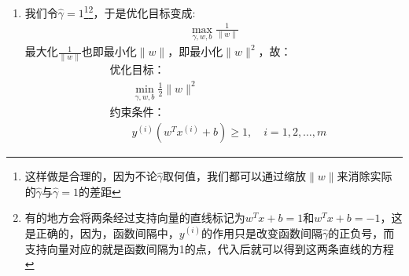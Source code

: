 \begin{enumerate}
	\item 我们令$\hat{\gamma}=1$\footnote{这样做是合理的，因为不论$\hat{\gamma}$取何值，我们都可以通过缩放$\|w\|$来消除实际的$\hat{\gamma}$与$\hat{\gamma}=1$的差距}\footnote{有的地方会将两条经过支持向量的直线标记为$w^Tx+b=1$和$w^Tx+b=-1$，这是正确的，因为，函数间隔中，$y^{(i)}$的作用只是改变函数间隔$\hat{\gamma}$的正负号，而支持向量对应的就是函数间隔为1的点，代入后就可以得到这两条直线的方程}，于是优化目标变成:
	\begin{align}
		\max_{\gamma, w, b} \frac{1}{\|w\|}
	\end{align}
	最大化$\frac{1}{\|w\|}$也即最小化$\|w\|$，即最小化$\|w\|^2$，故：
	\begin{align}
		&\text{优化目标：} \\
		& \qquad \min_{\gamma, w, b} \frac{1}{2}\|w\|^2 \\
		&\text{约束条件：} \\
		& \qquad y^{(i)}(w^Tx^{(i)}+b) \geq 1, \quad i=1, 2, \dots, m
	\end{align}
\end{enumerate}




































